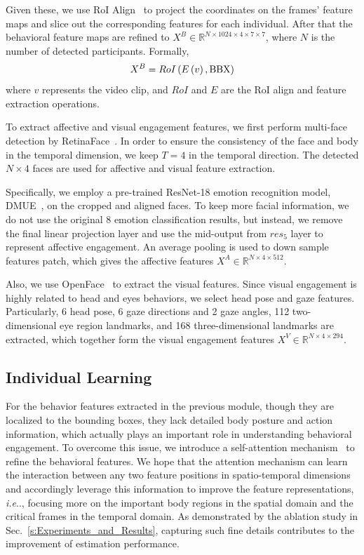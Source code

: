 \documentclass[VANCOUVER,STIX1COL]{WileyNJD-v2}
\makeatletter
\DeclareRobustCommand\onedot{\futurelet\@let@token\@onedot}
\def\@onedot{\ifx\@let@token.\else.\null\fi\xspace}
\def\ie{\emph{i.e}\onedot}
\makeatother
\begin{document}
Given these, we use RoI Align~\cite{He2017Mask} to project the coordinates on the frames' feature maps and slice out the corresponding features for each individual. After that the behavioral feature maps are refined to $X^B \in \mathbb{R}^{N\times1024\times4\times7\times7}$, where $N$ is the number of detected participants. Formally,
\begin{equation}
  X^B = RoI\left(E\left(v\right), {\rm BBX}\right)
\end{equation}
where $v$ represents the video clip, and $RoI$ and $E$ are the RoI align and feature extraction operations.

To extract affective and visual engagement features, we first perform multi-face detection by RetinaFace~\cite{Deng2020RetinaFace}. In order to ensure the consistency of the face and body in the temporal dimension, we keep $T = 4$ in the temporal direction. The detected $N\times4$ faces are used for affective and visual feature extraction.

Specifically, we employ a pre-trained ResNet-18 emotion recognition model, DMUE~\cite{She2021Dive}, on the cropped and aligned faces. To keep more facial information, we do not use the original 8 emotion classification results, but instead, we remove the final linear projection layer and use the mid-output from $res_5$ layer to represent affective engagement. An average pooling is used to down sample features patch, which gives the affective features $X^A \in \mathbb{R}^{N\times4\times512}$.

Also, we use OpenFace~\cite{Baltrusaitis2018OpenFace} to extract the visual features. Since visual engagement is highly related to head and eyes behaviors, we select head pose and gaze features. Particularly, 6 head pose, 6 gaze directions and 2 gaze angles, 112 two-dimensional eye region landmarks, and 168 three-dimensional landmarks are extracted, which together form the visual engagement features $X^V \in \mathbb{R}^{N\times4\times294}$.

\subsection{Individual Learning}
\label{subs:Individual_Learning}

For the behavior features extracted in the previous module, though they are localized to the bounding boxes, they lack detailed body posture and action information, which actually plays an important role in understanding behavioral engagement. To overcome this issue, we introduce a self-attention mechanism~\cite{Wang2018NonLocal} to refine the behavioral features. We hope that the attention mechanism can learn the interaction between any two feature positions in spatio-temporal dimensions and accordingly leverage this information to improve the feature representations, \ie, focusing more on the important body regions in the spatial domain and the critical frames in the temporal domain. As demonstrated by the ablation study in Sec.~\ref{s:Experiments_and_Results}, capturing such fine details contributes to the improvement of estimation performance.
\end{document}
